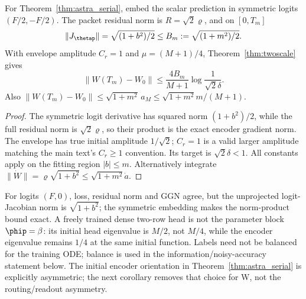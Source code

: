 \begin{corollary}
\label{cor:astra_serial_bound}
For Theorem~\ref{thm:astra_serial}, embed the scalar prediction in
symmetric logits $(F/2,-F/2)$. The packet residual norm is
$R=\sqrt2\varrho$, and on $[0,T_m]$
\[
 \|J_\thetap\|=\sqrt{(1+b^2)/2}\le B_m:=\sqrt{(1+m^2)/2}.
\]
With envelope amplitude $C_r=1$ and $\mu=(M+1)/4$,
Theorem~\ref{thm:twoscale} gives
\begin{equation}\label{eq:astra_serial_bound}
 \|W(T_m)-W_0\|\le\frac{4B_m}{M+1}\log\frac1{\sqrt2\delta}.
\end{equation}
Also $\|W(T_m)-W_0\|\le\sqrt{1+m^2}\,a_M
\le\sqrt{1+m^2}m/(M+1)$.
\end{corollary}
\begin{proof}
The symmetric logit derivative has squared norm $(1+b^2)/2$, while
the full residual norm is $\sqrt2\varrho$, so their product is the
exact encoder gradient norm. The envelope has true initial amplitude
$1/\sqrt2$; $C_r=1$ is a valid larger amplitude matching the main
text's $C_r\ge1$ convention. Its target is $\sqrt2\delta<1$.
All constants apply on the fitting region $|b|\le m$.
Alternatively integrate $\|\dot W\|=\varrho\sqrt{1+b^2}
\le\sqrt{1+m^2}\dot a$.
\end{proof}
\begin{remark}
For logits $(F,0)$, loss, residual norm and GGN agree, but the unprojected
logit-Jacobian norm is $\sqrt{1+b^2}$; the symmetric embedding makes
the norm-product bound exact. A freely trained dense two-row head is
not the parameter block $\phip=\beta$: its initial head eigenvalue is
$M/2$, not $M/4$, while the encoder eigenvalue remains $1/4$ at the
same initial function. Labels need not be balanced for the training
ODE; balance is used in the information/noisy-accuracy statement below.
The initial encoder orientation in Theorem~\ref{thm:astra_serial} is
explicitly asymmetric; the next corollary removes that choice for W,
not the routing/readout asymmetry.
\end{remark}

